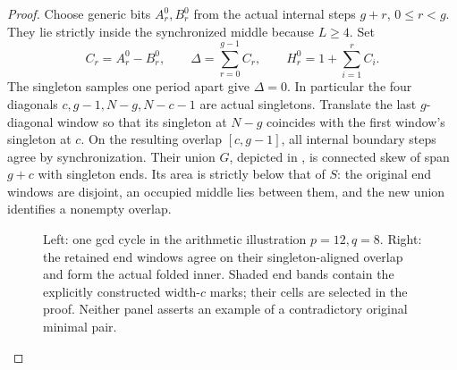 \documentclass[11pt,a4paper]{amsart}
\numberwithin{equation}{section}
\theoremstyle{plain}
\theoremstyle{definition}
\begin{document}
\begin{proof}
Choose generic bits \(A_r^0,B_r^0\) from the actual internal steps \(g+r\),
\(0\le r<g\).  They lie strictly inside the synchronized middle because
\(L\ge4\).  Set
\[
 C_r=A_r^0-B_r^0,\qquad
 \Delta=\sum_{r=0}^{g-1}C_r,\qquad
 H_r^0=1+\sum_{i=1}^rC_i.
\]
The singleton samples one period apart give \(\Delta=0\).
In particular the four diagonals \(c,g-1,N-g,N-c-1\) are actual
singletons.  Translate the last \(g\)-diagonal window so that its singleton
at \(N-g\) coincides with the first window's singleton at \(c\).  On the
resulting overlap \([c,g-1]\), all internal boundary steps agree by
synchronization.  Their union \(G\), depicted in ,
is connected skew of span \(g+c\) with singleton ends.  Its area is strictly below that of \(S\): the original end
windows are disjoint, an occupied middle lies between them, and the new
union identifies a nonempty overlap.

\begin{figure}[ht]
\centering
{}
\caption{Left: one gcd cycle in the arithmetic illustration \(p=12,q=8\).
Right: the retained end windows agree on their singleton-aligned overlap
and form the actual folded inner.  Shaded end bands contain the explicitly
constructed width-\(c\) marks; their cells are selected in the proof.
Neither panel asserts an example of a contradictory original minimal pair.}
\label{fig:cycles-fold}
\end{figure}


\end{proof}
\end{document}
